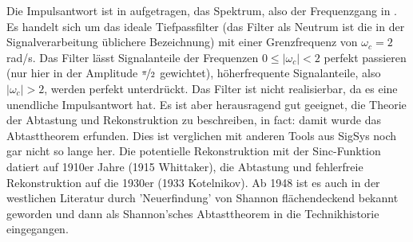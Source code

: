 \begin{Ansatz}
Die Impulsantwort ist in  aufgetragen,
das Spektrum, also der Frequenzgang in .
Es handelt sich um das ideale Tiefpassfilter (das Filter als Neutrum ist die in der
Signalverarbeitung üblichere Bezeichnung) mit einer Grenzfrequenz von $\omega_c=2$ rad/s.
Das Filter lässt Signalanteile der Frequenzen $0\leq |\omega_c|<2$ perfekt passieren
(nur hier in der Amplitude $\nicefrac{\pi}{2}$ gewichtet), höherfrequente
Signalanteile, also $|\omega_c|>2$, werden perfekt unterdrückt.
Das Filter ist nicht realisierbar, da es eine unendliche Impulsantwort hat.
Es ist aber herausragend gut geeignet, die Theorie der Abtastung und Rekonstruktion
zu beschreiben, in fact: damit wurde das Abtasttheorem erfunden. Dies ist verglichen
mit anderen Tools aus SigSys noch gar nicht so lange her. Die potentielle
Rekonstruktion mit der Sinc-Funktion datiert auf 1910er Jahre (1915 Whittaker),
die Abtastung und fehlerfreie Rekonstruktion auf die 1930er (1933 Kotelnikov).
Ab 1948 ist es auch in der westlichen Literatur durch 'Neuerfindung' von Shannon
flächendeckend bekannt geworden und dann als Shannon'sches Abtasttheorem in die
Technikhistorie eingegangen.
\end{Ansatz}
